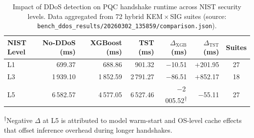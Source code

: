 \begin{table}[!t]
\centering
\footnotesize
\setlength{\tabcolsep}{5pt}
\caption{Impact of DDoS detection on PQC handshake runtime across
NIST security levels.  Data aggregated from 72 hybrid
KEM\,$\times$\,SIG suites
(source: \texttt{bench\_ddos\_results/20260302\_135859/comparison.json}).}
\label{tab:ddos-impact-on-pqc}
\begin{tabular}{@{}lrrrrrc@{}}
\toprule
\textbf{NIST Level} &
\textbf{No-DDoS (ms)} &
\textbf{XGBoost (ms)} &
\textbf{TST (ms)} &
\textbf{$\Delta_{\mathrm{XGB}}$ (ms)} &
\textbf{$\Delta_{\mathrm{TST}}$ (ms)} &
\textbf{Suites} \\
\midrule
L1 & 699.37       & 688.86       & 901.32       & $-$10.51    & $+$201.95  & 27 \\
L3 & 1\,939.10    & 1\,852.59    & 2\,791.27    & $-$86.51    & $+$852.17  & 18 \\
L5 & 6\,582.57    & 4\,577.05    & 6\,527.46    & $-$2\,005.52\textsuperscript{$\dagger$} & $-$55.11 & 27 \\
\bottomrule
\end{tabular}

\smallskip
\raggedright
\textsuperscript{$\dagger$}Negative $\Delta$ at L5 is attributed to
model warm-start and OS-level cache effects that offset inference
overhead during longer handshakes.
\end{table}

